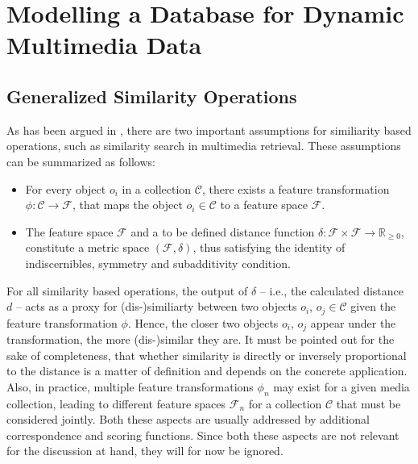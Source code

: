 \chapter{Modelling a Database for Dynamic Multimedia Data}
\label{chapter:system_model}


\section{Generalized Similarity Operations}

As has been argued in , there are two important assumptions for similiarity based operations, such as similarity search in multimedia retrieval. These assumptions can be summarized as follows:

\begin{itemize}
    \item For every object $o_{i}$ in a collection $\mathcal{C}$, there exists a feature transformation $\phi \colon \mathcal{C} \to \mathcal{F}$, that maps the object $o_{i} \in \mathcal{C}$ to a feature space $\mathcal{F}$.
    \item The feature space $\mathcal{F}$ and a to be defined distance function $\delta \colon \mathcal{F} \times \mathcal{F} \to \mathbb{R}_{\geq 0}$, constitute a metric space $(\mathcal{F},\delta)$, thus satisfying the identity of indiscernibles, symmetry and subadditivity condition.
\end{itemize}

For all similarity based operations, the output of $\delta$ -- i.e., the calculated distance $d$ -- acts as a proxy for (dis-)similiarty between two objects $o_{i}$, $o_{j} \in \mathcal{C}$ given the feature transformation $\phi$. Hence, the closer two objects $o_{i}$, $o_{j}$ appear under the transformation, the more (dis-)similar they are. It must be pointed out for the sake of completeness, that whether similarity is directly or inversely proportional to the distance is a matter of definition and depends on the concrete application. Also, in practice, multiple feature transformations $\phi_n$ may exist for a given media collection, leading to different feature spaces $\mathcal{F}_n$ for a collection $\mathcal{C}$ that must be considered jointly. Both these aspects are usually addressed by additional correspondence and scoring functions. Since both these aspects are not relevant for the discussion at hand, they will for now be ignored.

